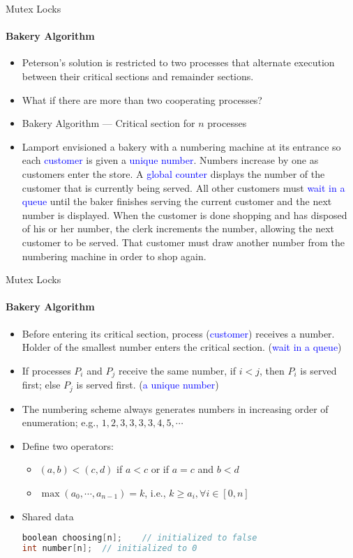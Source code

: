 \documentclass[10pt]{beamer}
\begin{document}
\begin{frame}{Mutex Locks}
\framesubtitle{Bakery Algorithm}
\begin{itemize}
 
\item Peterson's solution is restricted to two processes that alternate execution between their critical sections and remainder sections. 
\item What if there are more than two cooperating processes?
\item Bakery Algorithm --- Critical section for $n$ processes
\item Lamport envisioned a bakery with a numbering machine at its entrance so each \textcolor{blue}{customer} is given a \textcolor{blue}{unique number}. Numbers increase by one as customers enter the store. A \textcolor{blue}{global counter} displays the number of the customer that is currently being served. All other customers must \textcolor{blue}{wait in a queue} until the baker finishes serving the current customer and the next number is displayed. When the customer is done shopping and has disposed of his or her number, the clerk increments the number, allowing the next customer to be served. That customer must draw another number from the numbering machine in order to shop again.
\end{itemize}
\end{frame}

\begin{frame}[fragile]{Mutex Locks}
\framesubtitle{Bakery Algorithm}
\begin{itemize}
 
\item Before entering its critical section, process (\textcolor{blue}{customer}) receives a number. Holder of the smallest number enters the critical section. (\textcolor{blue}{wait in a queue})
\item If processes $P_i$ and $P_j$ receive the same number, if $i < j$, then $P_i$ is served first; else $P_j$ is served first. (\textcolor{blue}{a unique number})
\item The numbering scheme always generates numbers in increasing order of enumeration; e.g., $1,2,3,3,3,3,4,5,\cdots$
\item Define two operators: 
\begin{itemize}
\item $(a,b) < (c,d)$ if $a < c$ or if $a = c$ and $b < d$
\item $\max (a_0,\cdots, a_{n-1})=k$, i.e., $k \geq a_i, \forall i\in[0,n]$
\end{itemize}
\item Shared data
\vspace{2pt}\\
\begin{uncoverenv}
\begin{lstlisting}[language=C]
boolean choosing[n];	// initialized to false
int number[n]; 	// initialized to 0
\end{lstlisting}
\end{uncoverenv}
\end{itemize}
\end{frame}
\end{document}
